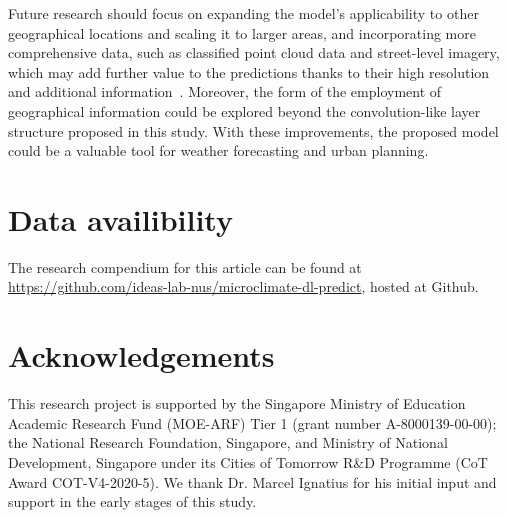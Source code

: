 \documentclass[a4paper,fleqn]{cas-sc}
\begin{document}
Future research should focus on expanding the model's applicability to other geographical locations and scaling it to larger areas, and incorporating more comprehensive data, such as classified point cloud data and street-level imagery, which may add further value to the predictions thanks to their high resolution and additional information~\citep{Megahed2021,2023_jag_svi_sensitivity}. Moreover, the form of the employment of geographical information could be explored beyond the convolution-like layer structure proposed in this study. With these improvements, the proposed model could be a valuable tool for weather forecasting and urban planning.

\section*{Data availibility}
The research compendium for this article can be found at \url{https://github.com/ideas-lab-nus/microclimate-dl-predict}, hosted at Github.

\section*{Acknowledgements}

This research project is supported by the Singapore Ministry of Education Academic Research Fund (MOE-ARF) Tier 1 (grant number A-8000139-00-00); the National Research Foundation, Singapore, and Ministry of National Development, Singapore under its Cities of Tomorrow R\&D Programme (CoT Award COT-V4-2020-5). We thank Dr. Marcel Ignatius for his initial input and support in the early stages of this study. 


\printcredits

% 







\end{document}

